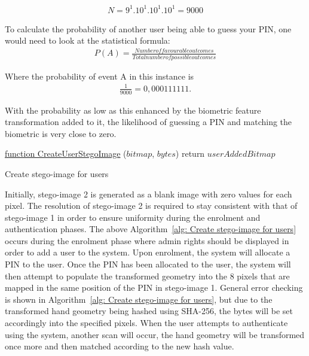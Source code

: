 \begin{gather}
    N = 9^{1}.10^{1}.10^{1}.10^{1} 
    = 9000    
\end{gather}



To calculate the probability of another user being able to guess your PIN, one would need to look at the statistical formula: 
\begin{gather}
    P (A) = \frac{Number of favourable outcomes}{Total number of possible outcomes}
\end{gather}


Where the probability of event A in this instance is 
\begin{gather}
    \frac{1}{9000} = 0,000111111.
\end{gather}

With the probability as low as this enhanced by the biometric feature transformation added to it, the likelihood of guessing a PIN and matching the biometric is very close to zero.


\begin{algorithm}
     \underline{function CreateUserStegoImage} ($bitmap$, $bytes$)\;
     return $userAddedBitmap$
     \caption{Create stego-image for users}
     \label{alg: Create stego-image for users}
     
\end{algorithm}


Initially, stego-image 2 is generated as a blank image with zero values for each pixel. The resolution of stego-image 2 is required to stay consistent with that of stego-image 1 in order to ensure uniformity during the enrolment and authentication phases. The above Algorithm~\ref{alg: Create stego-image for users} occurs during the enrolment phase where admin rights should be displayed in order to add a user to the system. Upon enrolment, the system will allocate a PIN to the user. Once the PIN has been allocated to the user, the system will then attempt to populate the transformed geometry into the 8 pixels that are mapped in the same position of the PIN in stego-image 1. General error checking is shown in Algorithm~\ref{alg: Create stego-image for users}, but due to the transformed hand geometry being hashed using SHA-256, the bytes will be set accordingly into the specified pixels. When the user attempts to authenticate using the system, another scan will occur, the hand geometry will be transformed once more and then matched according to the new hash value.

